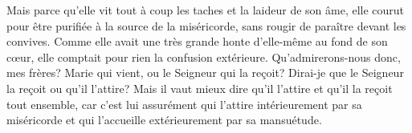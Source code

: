  Mais parce qu’elle vit tout à coup les taches et la laideur de son âme,
	elle courut pour être purifiée à la source de la miséricorde,
	sans rougir de paraître devant les convives.
Comme elle avait une très grande honte d’elle-même au fond de son cœur,
	elle comptait pour rien la confusion extérieure.
Qu’admirerons-nous donc, mes frères?
	Marie qui vient, ou le Seigneur qui la reçoit?
Dirai-je que le Seigneur la reçoit ou qu’il l’attire?
	Mais il vaut mieux dire qu’il l’attire et qu’il la reçoit tout ensemble,
	car c’est lui assurément qui l’attire intérieurement par sa miséricorde
	et qui l’accueille extérieurement par sa mansuétude.
